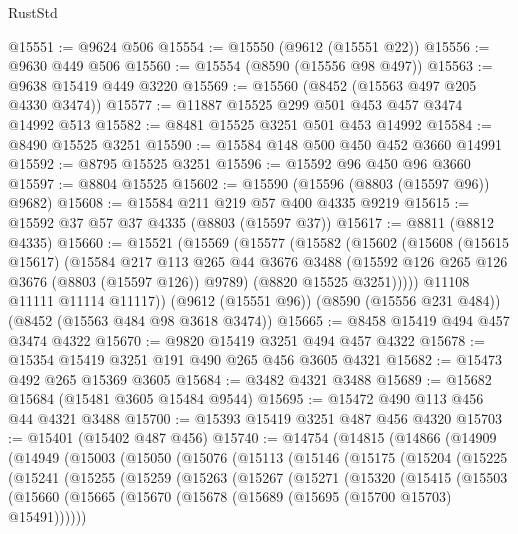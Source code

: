 \begin{lexlean}{RustStd}
\begin{coremodule}
@15551 := @9624 @506
@15554 := @15550 (@9612 (@15551 @22))
@15556 := @9630 @449 @506
@15560 := @15554 (@8590 (@15556 @98 @497))
@15563 := @9638 @15419 @449 @3220
@15569 := @15560 (@8452 (@15563 @497 @205 @4330 @3474))
@15577 := @11887 @15525 @299 @501 @453 @457 @3474 @14992 @513
@15582 := @8481 @15525 @3251 @501 @453 @14992
@15584 := @8490 @15525 @3251
@15590 := @15584 @148 @500 @450 @452 @3660 @14991
@15592 := @8795 @15525 @3251
@15596 := @15592 @96 @450 @96 @3660
@15597 := @8804 @15525
@15602 := @15590 (@15596 (@8803 (@15597 @96)) @9682)
@15608 := @15584 @211 @219 @57 @400 @4335 @9219
@15615 := @15592 @37 @57 @37 @4335 (@8803 (@15597 @37))
@15617 := @8811 (@8812 @4335)
@15660 := @15521
    (@15569
      (@15577
        (@15582
          (@15602
            (@15608
              (@15615 @15617)
              (@15584
                @217
                @113
                @265
                @44
                @3676
                @3488
                (@15592 @126 @265 @126 @3676 (@8803 (@15597 @126)) @9789)
                (@8820 @15525 @3251)))))
        @11108
        @11111
        @11114
        @11117))
    (@9612 (@15551 @96))
    (@8590 (@15556 @231 @484))
    (@8452 (@15563 @484 @98 @3618 @3474))
@15665 := @8458 @15419 @494 @457 @3474 @4322
@15670 := @9820 @15419 @3251 @494 @457 @4322
@15678 := @15354 @15419 @3251 @191 @490 @265 @456 @3605 @4321
@15682 := @15473 @492 @265 @15369 @3605
@15684 := @3482 @4321 @3488
@15689 := @15682 @15684 (@15481 @3605 @15484 @9544)
@15695 := @15472 @490 @113 @456 @44 @4321 @3488
@15700 := @15393 @15419 @3251 @487 @456 @4320
@15703 := @15401 (@15402 @487 @456)
@15740 := @14754
    (@14815
      (@14866
        (@14909
          (@14949
            (@15003
              (@15050
                (@15076
                  (@15113
                    (@15146
                      (@15175
                        (@15204
                          (@15225
                            (@15241
                              (@15255
                                (@15259
                                  (@15263
                                    (@15267
                                      (@15271
                                        (@15320
                                          (@15415
                                            (@15503
                                              (@15660
                                                (@15665
                                                  (@15670
                                                    (@15678
                                                      (@15689 (@15695 (@15700 @15703) @15491))))))

\end{coremodule}
\end{lexlean}
